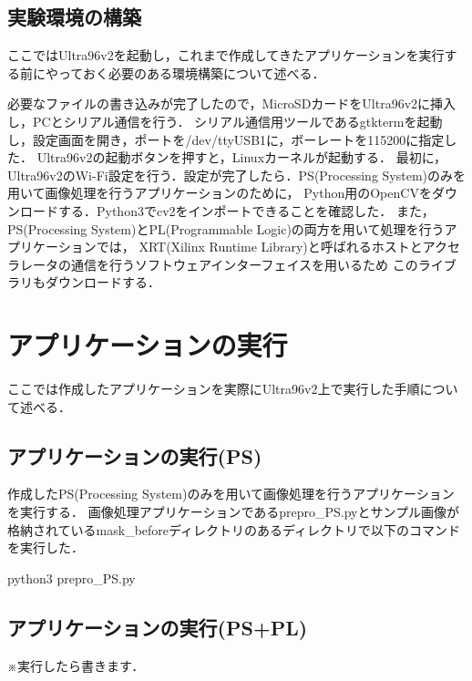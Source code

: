 \documentclass[11pt,a4j]{jreport}
\begin{document}
\subsection{実験環境の構築}
ここではUltra96v2を起動し，これまで作成してきたアプリケーションを実行する前にやっておく必要のある環境構築について述べる．

必要なファイルの書き込みが完了したので，MicroSDカードをUltra96v2に挿入し，PCとシリアル通信を行う．
シリアル通信用ツールであるgtktermを起動し，設定画面を開き，ポートを/dev/ttyUSB1に，ボーレートを115200に指定した．
Ultra96v2の起動ボタンを押すと，Linuxカーネルが起動する．
最初に，Ultra96v2のWi-Fi設定を行う．設定が完了したら．PS(Processing System)のみを用いて画像処理を行うアプリケーションのために，
Python用のOpenCVをダウンロードする．Python3でcv2をインポートできることを確認した．
また，PS(Processing System)とPL(Programmable Logic)の両方を用いて処理を行うアプリケーションでは，
XRT(Xilinx Runtime Library)と呼ばれるホストとアクセラレータの通信を行うソフトウェアインターフェイスを用いるため
このライブラリもダウンロードする．

\section{アプリケーションの実行}
ここでは作成したアプリケーションを実際にUltra96v2上で実行した手順について述べる．
\subsection{アプリケーションの実行(PS)}
作成したPS(Processing System)のみを用いて画像処理を行うアプリケーションを実行する．
画像処理アプリケーションであるprepro_PS.pyとサンプル画像が格納されているmask_beforeディレクトリのあるディレクトリで以下のコマンドを実行した．

python3 prepro_PS.py

\subsection{アプリケーションの実行(PS+PL)}
※実行したら書きます．
\end{document}
